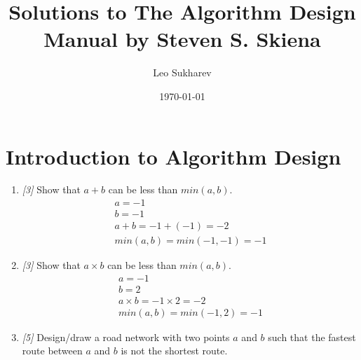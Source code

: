 \documentclass[10pt, letterpaper]{article}
\title{Solutions to The Algorithm Design Manual by Steven S. Skiena}
\author{Leo Sukharev}
\date{\today}
\begin{document}
    \maketitle
    \newpage

    \section{Introduction to Algorithm Design}

    \begin{enumerate}
        \subsection*{Finding Counterexamples}

        \item \textit{[3]} Show that $a + b$ can be less than $min(a,b)$.
        \begin{gather*}
            a = -1 \\
            b = -1 \\
            a + b = -1 + (-1) = -2 \\
            min(a,b) = min(-1, -1) = -1
        \end{gather*}

        \item \textit{[3]} Show that $a \times b$ can be less than $min(a,b)$.
        \begin{gather*}
            a = -1 \\
            b = 2 \\
            a \times b = -1 \times 2 = -2 \\
            min(a,b) = min(-1, 2) = -1
        \end{gather*}

        \item \textit{[5]} Design/draw a road network with two points $a$ and $b$ such that the
        fastest route between $a$ and $b$ is not the shortest route.


\end{enumerate}
\end{document}

